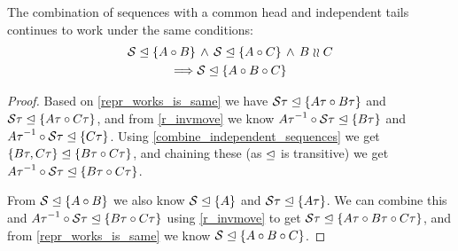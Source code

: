 \begin{mylem}\label{indep_prefix_combine}
The combination of sequences with a common head and independent tails 
continues to work under the same conditions:
\begin{gather*}
 {\mathcal{S}}\trianglelefteq{\{{A\circ B}\}} \,\wedge\, {\mathcal{S}}\trianglelefteq{\{{A\circ C}\}} \,\wedge\, B\mathrel{\wr\wr} C \\
 \Longrightarrow {\mathcal{S}}\trianglelefteq{\{{A\circ B\circ C}\}}
\end{gather*}
\end{mylem}
\begin{proof}
Based on \cref{repr_works_is_same} we have
${\mathcal{S}\tau}\trianglelefteq{\{{A\tau\circ B\tau}\}}$ and ${\mathcal{S}\tau}\trianglelefteq{\{{A\tau\circ C\tau}\}}$,
and from \cref{r_invmove} we know
${{A\tau}^{-1}\circ \mathcal{S\tau}}\trianglelefteq{\{{B\tau}\}}$ 
and ${{A\tau}^{-1}\circ \mathcal{S\tau}}\trianglelefteq{\{{C\tau}\}}$.
Using \cref{combine_independent_sequences} we get
${\{{B\tau,C\tau}\}}\trianglelefteq{\{{B\tau\circ C\tau}\}}$,
and chaining these (as $\trianglelefteq$ is transitive)
we get
${{A\tau}^{-1}\circ \mathcal{S}\tau}\trianglelefteq{\{{B\tau\circ C\tau}\}}$.

From ${\mathcal{S}}\trianglelefteq{\{{A\circ B}\}}$ we also know ${\mathcal{S}}\trianglelefteq{\{{A}\}}$ and ${\mathcal{S}\tau}\trianglelefteq{\{{A\tau}\}}$.
We can combine this and ${{A\tau}^{-1}\circ \mathcal{S}\tau}\trianglelefteq{\{{B\tau\circ C\tau}\}}$ using
\cref{r_invmove} to get
${\mathcal{S}\tau}\trianglelefteq{\{{A\tau\circ B\tau\circ C\tau}\}}$, and from \cref{repr_works_is_same} we know
${\mathcal{S}}\trianglelefteq{\{{A\circ B\circ C}\}}$.
\end{proof}
